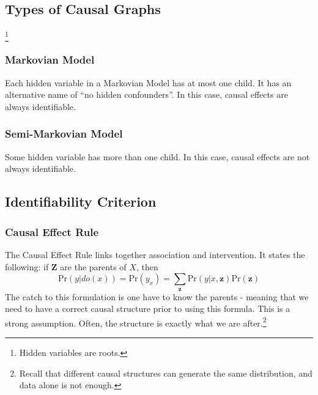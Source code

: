 \documentclass[11pt]{article}
\newcommand{\bz}{\mathbf{z}}
\newcommand{\pr}{\mathrm{Pr}}
\begin{document}
\subsection{Types of Causal Graphs}\footnote{Hidden variables are roots.}
\subsubsection{Markovian Model}
Each hidden variable in a Markovian Model has at most one child. It has an alternative name of ``no hidden confounders''. In this case, causal effects are always identifiable. 

\subsubsection{Semi-Markovian Model}
Some hidden variable has more than one child. In this case, causal effects are not always identifiable. 

\subsection{Identifiability Criterion}
\subsubsection{Causal Effect Rule}
The Causal Effect Rule links together association and intervention. It states the following: if $\mathbf Z$ are the parents of $X$, then
\begin{equation}
	\pr (y | do(x)) = \pr(y_x) = \sum_{\mathbf z} \pr (y | x, \bz ) \pr (\bz)
\end{equation}
The catch to this formulation is one have to know the parents - meaning that we need to have a correct causal structure prior to using this formula. This is a strong assumption. Often, the structure is exactly what we are after.\footnote{
Recall that different causal structures can generate the same distribution, and data alone is not enough.
} 
\end{document}
